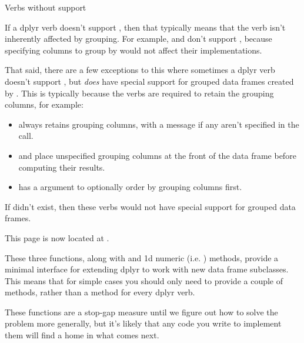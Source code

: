 \documentclass[a4paper]{book}
\begin{document}
\begin{Description}
%
\begin{SubSection}{Verbs without  support}

If a dplyr verb doesn't support , then that typically means that the verb isn't inherently affected by grouping.
For example,  and  don't support , because specifying columns to group by would not affect their implementations.

That said, there are a few exceptions to this where sometimes a dplyr verb doesn't support , but \emph{does} have special support for grouped data frames created by .
This is typically because the verbs are required to retain the grouping columns, for example:
\begin{itemize}

\item{}  always retains grouping columns, with a message if any aren't specified in the  call.
\item{}  and  place unspecified grouping columns at the front of the data frame before computing their results.
\item{}  has a  argument to optionally order by grouping columns first.

\end{itemize}


If  didn't exist, then these verbs would not have special support for grouped data frames.
\end{SubSection}

\end{Description}
%
\begin{Description}
This page is now located at
.
\end{Description}
%
\begin{Description}
\strong{[Experimental]}

These three functions, along with  and 1d numeric \code{[}
(i.e. ) methods, provide a minimal interface for extending dplyr
to work with new data frame subclasses. This means that for simple cases
you should only need to provide a couple of methods, rather than a method
for every dplyr verb.

These functions are a stop-gap measure until we figure out how to solve
the problem more generally, but it's likely that any code you write to
implement them will find a home in what comes next.
\end{Description}
\end{document}
